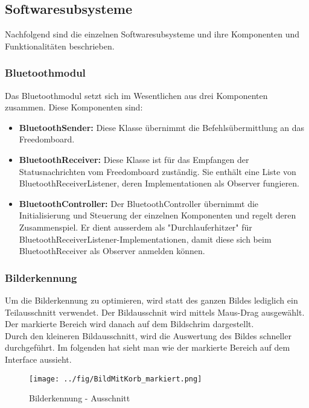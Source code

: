 \subsection{Softwaresubsysteme}
Nachfolgend sind die einzelnen Softwaresubsysteme und ihre Komponenten und Funktionalitäten beschrieben.
\subsubsection{Bluetoothmodul}
Das Bluetoothmodul setzt sich im Wesentlichen aus drei Komponenten zusammen. Diese Komponenten sind:
\begin{itemize}
	\item{\textbf{BluetoothSender:} Diese Klasse übernimmt die Befehlsübermittlung an das Freedomboard.}
	\item{\textbf{BluetoothReceiver:} Diese Klasse ist für das Empfangen der Statusnachrichten vom Freedomboard zuständig. Sie enthält eine Liste von BluetoothReceiverListener, deren Implementationen als Observer fungieren.}
	\item{\textbf{BluetoothController:} Der BluetoothController übernimmt die Initialisierung und Steuerung der einzelnen Komponenten und regelt deren Zusammenspiel. Er dient ausserdem als "Durchlauferhitzer" für BluetoothReceiverListener-Implementationen, damit diese sich beim BluetoothReceiver als Observer anmelden können.}
\end{itemize}

\subsubsection{Bilderkennung}

Um die Bilderkennung zu optimieren, wird statt des ganzen Bildes lediglich ein Teilausschnitt verwendet.
Der Bildausschnit wird mittels Maus-Drag ausgewählt. Der markierte Bereich wird danach auf dem Bildschrim 
dargestellt. \\

Durch den kleineren Bildausschnitt, wird die Auswertung des Bildes schneller durchgeführt. Im folgenden hat
sieht man wie der markierte Bereich auf dem Interface aussieht.\\

\begin{figure}[h!]          
	\centering             
	\texttt{[image: ../fig/BildMitKorb\_markiert.png]}
	\caption{Bilderkennung - Ausschnitt}
	\label{fig:Bilderkennung_ausschnitt}        
\end{figure}

